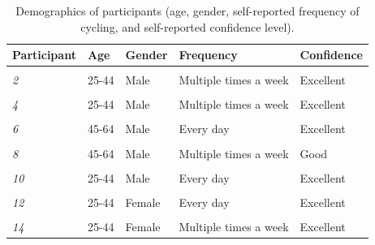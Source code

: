 \documentclass[]{elsarticle} %
\begin{document}
\begin{table}

\caption{\label{tab:unnamed-chunk-1}\label{tab:demographics}Demographics of participants (age, gender, self-reported frequency of cycling, and self-reported confidence level).}
\centering
\fontsize{7}{9}\selectfont
\begin{tabular}[t]{>{}l|llll}
\toprule
Participant & Age & Gender & Frequency & Confidence\\
\midrule
\em{\cellcolor{gray!6}{1}} & \cellcolor{gray!6}{18-24} & \cellcolor{gray!6}{Male} & \cellcolor{gray!6}{Every day} & \cellcolor{gray!6}{Excellent}\\
\em{2} & 25-44 & Male & Multiple times a week & Excellent\\
\em{\cellcolor{gray!6}{3}} & \cellcolor{gray!6}{25-44} & \cellcolor{gray!6}{Female} & \cellcolor{gray!6}{Multiple times a week} & \cellcolor{gray!6}{Excellent}\\
\em{4} & 25-44 & Male & Multiple times a week & Excellent\\
\em{\cellcolor{gray!6}{5}} & \cellcolor{gray!6}{45-64} & \cellcolor{gray!6}{Male} & \cellcolor{gray!6}{Multiple times a week} & \cellcolor{gray!6}{Good}\\
\addlinespace
\em{6} & 45-64 & Male & Every day & Excellent\\
\em{\cellcolor{gray!6}{7}} & \cellcolor{gray!6}{45-64} & \cellcolor{gray!6}{Male} & \cellcolor{gray!6}{Multiple times a week} & \cellcolor{gray!6}{Excellent}\\
\em{8} & 45-64 & Male & Multiple times a week & Good\\
\em{\cellcolor{gray!6}{9}} & \cellcolor{gray!6}{25-44} & \cellcolor{gray!6}{Female} & \cellcolor{gray!6}{Multiple times a week} & \cellcolor{gray!6}{Excellent}\\
\em{10} & 25-44 & Male & Every day & Excellent\\
\addlinespace
\em{\cellcolor{gray!6}{11}} & \cellcolor{gray!6}{25-44} & \cellcolor{gray!6}{Female} & \cellcolor{gray!6}{Multiple times a week} & \cellcolor{gray!6}{Good}\\
\em{12} & 25-44 & Female & Every day & Excellent\\
\em{\cellcolor{gray!6}{13}} & \cellcolor{gray!6}{25-44} & \cellcolor{gray!6}{Male} & \cellcolor{gray!6}{Every day} & \cellcolor{gray!6}{Excellent}\\
\em{14} & 25-44 & Female & Multiple times a week & Excellent\\
\bottomrule
\end{tabular}
\end{table}
\end{document}
